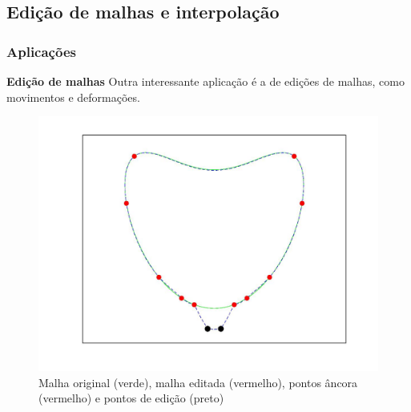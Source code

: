 \subsection{Edição de malhas e interpolação}

\begin{frame}
\frametitle{{\bf \color{blue} Aplicações}}
	
\begin{block}{\bf Edição de malhas}
	Outra interessante aplicação é a de edições de malhas, como movimentos e deformações.
\end{block}

\begin{center}
	\begin{figure}
		\includegraphics[trim={4cm, 3cm, 4cm, 2cm},clip,width=0.5\linewidth]{imagens/edi_dashed.jpg}
		\caption{Malha original (verde), malha editada (vermelho), pontos âncora (vermelho) e pontos de edição (preto)}
	\end{figure}
\end{center}

\end{frame}

